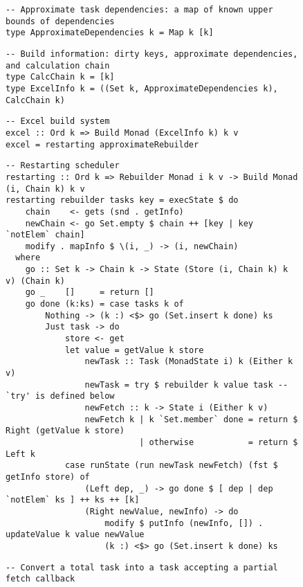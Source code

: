 \begin{figure}
\begin{verbatim}
-- Approximate task dependencies: a map of known upper bounds of dependencies
type ApproximateDependencies k = Map k [k]
\end{verbatim}
\vspace{1mm}
\begin{verbatim}
-- Build information: dirty keys, approximate dependencies, and calculation chain
type CalcChain k = [k]
type ExcelInfo k = ((Set k, ApproximateDependencies k), CalcChain k)
\end{verbatim}
\vspace{1mm}
\begin{verbatim}
-- Excel build system
excel :: Ord k => Build Monad (ExcelInfo k) k v
excel = restarting approximateRebuilder
\end{verbatim}
\vspace{1mm}
\begin{verbatim}
-- Restarting scheduler
restarting :: Ord k => Rebuilder Monad i k v -> Build Monad (i, Chain k) k v
restarting rebuilder tasks key = execState $ do
    chain    <- gets (snd . getInfo)
    newChain <- go Set.empty $ chain ++ [key | key `notElem` chain]
    modify . mapInfo $ \(i, _) -> (i, newChain)
  where
    go :: Set k -> Chain k -> State (Store (i, Chain k) k v) (Chain k)
    go _    []     = return []
    go done (k:ks) = case tasks k of
        Nothing -> (k :) <$> go (Set.insert k done) ks
        Just task -> do
            store <- get
            let value = getValue k store
                newTask :: Task (MonadState i) k (Either k v)
                newTask = try $ rebuilder k value task -- `try' is defined below
                newFetch :: k -> State i (Either k v)
                newFetch k | k `Set.member` done = return $ Right (getValue k store)
                           | otherwise           = return $ Left k
            case runState (run newTask newFetch) (fst $ getInfo store) of
                (Left dep, _) -> go done $ [ dep | dep `notElem` ks ] ++ ks ++ [k]
                (Right newValue, newInfo) -> do
                    modify $ putInfo (newInfo, []) . updateValue k value newValue
                    (k :) <$> go (Set.insert k done) ks
\end{verbatim}
\vspace{1mm}
\begin{verbatim}
-- Convert a total task into a task accepting a partial fetch callback

\end{verbatim}
\end{figure}
